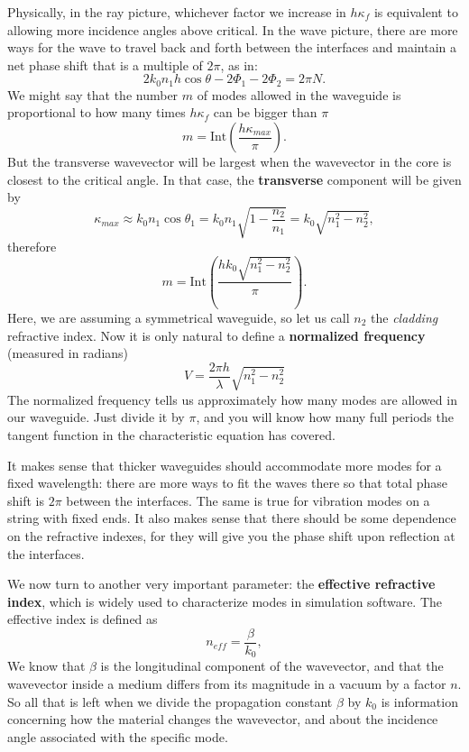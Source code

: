 Physically, in the ray picture, whichever factor we increase in $h\kappa_f$ is equivalent to allowing more incidence angles above critical. In the wave picture, there are more ways for the wave to travel back and forth between the interfaces and maintain a net phase shift that is a multiple of $2\pi$, as in:
\begin{equation}
    2k_0n_1h\cos\theta-2\Phi_1-2\Phi_2=2\pi N.
\end{equation}
We might say that the number $m$ of modes allowed in the waveguide is proportional to how many times $h\kappa_f$ can be bigger than $\pi$
\begin{equation}
    m=\text{Int}\left(\frac{h\kappa_{max}}{\pi}\right).
\end{equation}
But the transverse wavevector will be largest when the wavevector in the core is closest to the critical angle. In that case, the \textbf{transverse} component will be given by
\begin{equation}
    \kappa_{max}\approx k_0n_1\cos\theta_1=k_0n_1\sqrt{1-\frac{n_2}{n_1}}=k_0\sqrt{n_1^2-n_2^2},
\end{equation}
therefore
\begin{equation}
    m=\text{Int}\left(\frac{hk_0\sqrt{n_1^2-n_2^2}}{\pi}\right).
\end{equation}
Here, we are assuming a symmetrical waveguide, so let us call $n_2$ the \textit{cladding} refractive index. Now it is only natural to define a \textbf{normalized frequency} (measured in radians)
\begin{equation}
    \boxed{V=\frac{2\pi h}{\lambda}\sqrt{n_1^2-n_2^2}}
\end{equation}
The normalized frequency tells us approximately how many modes are allowed in our waveguide. Just divide it by $\pi$, and you will know how many full periods the tangent function in the characteristic equation has covered.

It makes sense that thicker waveguides should accommodate more modes for a fixed wavelength: there are more ways to fit the waves there so that total phase shift is $2\pi$ between the interfaces. The same is true for vibration modes on a string with fixed ends. It also makes sense that there should be some dependence on the refractive indexes, for they will give you the phase shift upon reflection at the interfaces.

We now turn to another very important parameter: the \textbf{effective refractive index}, which is widely used to characterize modes in simulation software. The effective index is defined as
\begin{equation}
    \boxed{n_{eff}=\frac{\beta}{k_0},}
\end{equation}
We know that $\beta$ is the longitudinal component of the wavevector, and that the wavevector inside a medium differs from its magnitude in a vacuum by a factor $n$. So all that is left when we divide the propagation constant $\beta$ by $k_0$ is information concerning how the material changes the wavevector, and about the incidence angle associated with the specific mode.

